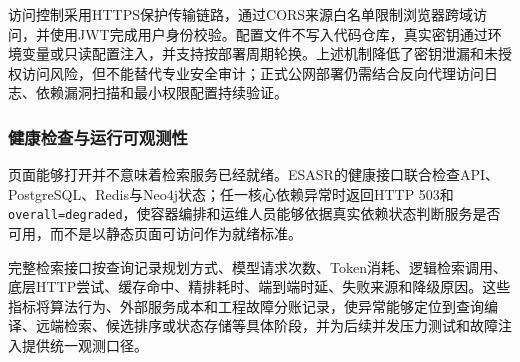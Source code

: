 \documentclass[a4paper,12pt,fontset=none]{ctexart}
\begin{document}
访问控制采用HTTPS保护传输链路，通过CORS来源白名单限制浏览器跨域访问，并使用JWT完成用户身份校验。配置文件不写入代码仓库，真实密钥通过环境变量或只读配置注入，并支持按部署周期轮换。上述机制降低了密钥泄漏和未授权访问风险，但不能替代专业安全审计；正式公网部署仍需结合反向代理访问日志、依赖漏洞扫描和最小权限配置持续验证。

\subsubsection{健康检查与运行可观测性}

页面能够打开并不意味着检索服务已经就绪。ESASR的健康接口联合检查API、PostgreSQL、Redis与Neo4j状态；任一核心依赖异常时返回HTTP 503和\texttt{overall=degraded}，使容器编排和运维人员能够依据真实依赖状态判断服务是否可用，而不是以静态页面可访问作为就绪标准。

完整检索接口按查询记录规划方式、模型请求次数、Token消耗、逻辑检索调用、底层HTTP尝试、缓存命中、精排耗时、端到端时延、失败来源和降级原因。这些指标将算法行为、外部服务成本和工程故障分账记录，使异常能够定位到查询编译、远端检索、候选排序或状态存储等具体阶段，并为后续并发压力测试和故障注入提供统一观测口径。
\end{document}
